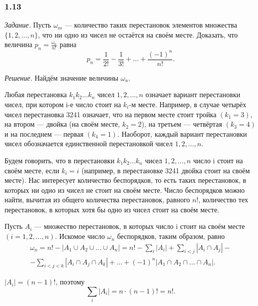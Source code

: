 \documentclass{book}
\begin{document}
\subsubsection*{1.13}

\textit{Задание.} Пусть $\omega_m$ --- количество таких перестановок элементов множества $\{1, 2,  \dotsc , n\}$, что ни одно из чисел не остаётся на своём месте.
Доказать, что величина $ p_n = \frac{\omega_n}{n!}$ равна
$$ p_n = \frac{1}{2!} - \frac{1}{3!} + \dotsc + \frac{\left(-1\right)^n}{n!}.$$

\textit{Решение.} Найдём значение величины $\omega_n$.

Любая перестановка $k_1k_2 \dotsc k_n$ чисел $1, 2,  \dotsc , n$ означает вариант перестановки чисел, при котором i-е число стоит на $k_i$-м месте.
Например, в случае четырёх чисел перестановка 3241 означает,
что на первом месте стоит тройка $ \left( k_1 = 3 \right) $,
на втором --- двойка (на своём месте, $k_2=2$), на третьем --- четвёртая $ \left( k_3 = 4 \right) $ и на последнем --- первая $ \left( k_4 = 1 \right) $.
Наоборот, каждый вариант перестановки чисел обозначается единственной перестановкой чисел $1, 2,  \dotsc , n$.

Будем говорить, что в перестановки
$ k_1 k_2 \dotsc k_n $ чисел $1, 2,  \dotsc , n$
число i стоит на своём месте, если $ k_i = i $ (например, в перестановке 3241 двойка стоит на своём месте).
Нас интересует количество беспорядков, то есть таких перестановок, в которых ни одно из чисел не стоит на своём месте.
Число беспорядков можно найти, вычитая из общего количества перестановок, равного $n!$, количество тех перестановок, в которых хотя бы одно из чисел стоит на своём месте.

Пусть $A_i$ --- множество перестановок, в которых число i стоит на своём месте $\left(i=1, 2,  \dotsc , n\right)$.
Искомое число $\omega_n$ беспорядков, таким образом, равно
\begin{equation*}
\begin{split}
\omega_n =
n! - |A_1 \cup A_2 \cup \dotsc \cup A_n| = n! - \sum \limits_i |A_i| + \sum \limits_{i<j} |A_i \cap A_j| - \\
-\sum \limits_{i<j<k} |A_i \cap A_j \cap A_k| + \dotsc + \left( -1 \right)^n |A_1 \cap A_2 \cap \dotsc \cap A_n|.
\end{split}
\end{equation*}

$ |A_i| = \left( n-1 \right)!$, поэтому
$$ \sum \limits_i |A_i| = n \cdot \left( n-1 \right)! = n!.$$
\end{document}
